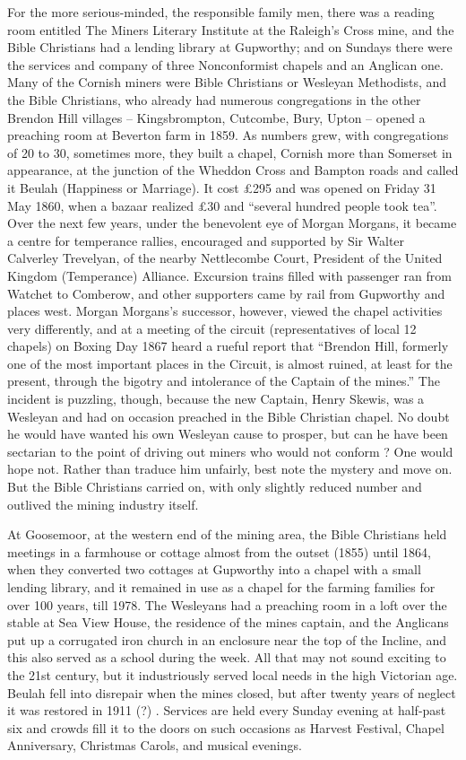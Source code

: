 \documentclass[10pt,a4paper]{article}
\begin{document}
For the more serious-minded, the responsible family men, there was a reading room entitled The Miners Literary Institute at the Raleigh’s Cross mine, and the Bible Christians had a lending library at Gupworthy;  and on Sundays there were  the services and company of  three Nonconformist chapels and an Anglican one. Many of the Cornish miners were Bible Christians or Wesleyan Methodists, and the Bible Christians, who already had numerous congregations in the other Brendon Hill villages – Kingsbrompton, Cutcombe, Bury, Upton – opened a preaching room at Beverton farm in 1859. As numbers grew, with congregations of 20 to 30, sometimes more, they built a chapel, Cornish more than Somerset in appearance, at the junction of the Wheddon Cross and Bampton roads and called it Beulah (Happiness or Marriage). It cost £295 and was opened on Friday 31 May 1860, when a bazaar realized £30 and “several hundred people took tea”.  Over the next few years, under the benevolent eye of Morgan Morgans,  it became a centre for temperance rallies, encouraged and supported by Sir Walter Calverley Trevelyan, of the nearby Nettlecombe Court, President of the United Kingdom (Temperance) Alliance. Excursion trains filled with passenger ran from Watchet to Comberow, and other supporters came by rail from Gupworthy and places west. Morgan Morgans’s successor, however, viewed the chapel activities very differently, and at a meeting of the circuit (representatives of local 12 chapels) on Boxing Day 1867 heard a rueful report that “Brendon Hill, formerly one of the most important places in the Circuit, is almost ruined, at least for the present, through the bigotry and intolerance of the Captain of the mines.” The incident is puzzling, though, because the new Captain, Henry Skewis, was a Wesleyan and had on occasion preached in the Bible Christian chapel.   No doubt he would have wanted his own Wesleyan cause to prosper,  but can he have been sectarian to the point of  driving out miners who would not conform ?  One would hope not. Rather than traduce him unfairly, best note the mystery and move on.  But the Bible Christians carried on, with only slightly reduced number and outlived the mining industry itself.

At Goosemoor, at the western end of the mining area, the Bible Christians held meetings in  a farmhouse  or cottage almost from the outset (1855) until 1864, when they converted two cottages at Gupworthy into a chapel with a small lending library, and it remained in use as a chapel for the farming families for over 100 years, till 1978. The Wesleyans had a preaching room in a loft over the stable at Sea View House, the residence of the mines captain, and the Anglicans put up a corrugated iron church in an enclosure near the top of the Incline, and this also served as a school during the week. All that may not sound exciting to the 21st century, but it industriously served local  needs in the high Victorian age. Beulah fell into disrepair when the mines closed, but after twenty years of neglect it was restored in 1911 (?) . Services are held every Sunday evening at half-past six  and crowds fill it to the doors on such occasions as Harvest Festival, Chapel Anniversary, Christmas Carols, and musical evenings.
\end{document}
